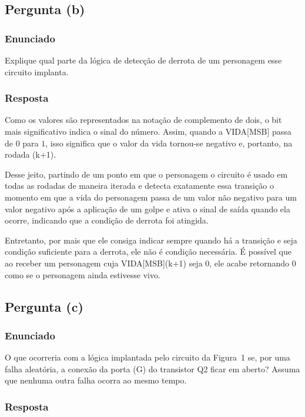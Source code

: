\documentclass[12pt]{article}
\begin{document}
\subsection{Pergunta (b)}

\subsubsection*{Enunciado}

Explique qual parte da lógica de detecção de derrota de um personagem
esse circuito implanta.

\subsubsection*{Resposta}

Como os valores são representados na notação de complemento de dois, o bit mais significativo indica o sinal do número. Assim, quando a VIDA[MSB] passa de $0$ para $1$, isso significa que o valor da vida tornou-se negativo e, portanto, na rodada (k+1).

Desse jeito, partindo de um ponto em que o personagem o circuito é usado em todas as rodadas de maneira iterada e detecta exatamente essa transição o momento em que a vida do personagem
passa de um valor não negativo para um valor negativo após a aplicação
de um golpe e ativa o sinal
de saída quando ela ocorre, indicando que a condição de derrota foi
atingida.

Entretanto, por mais que ele consiga indicar sempre quando há a transição e seja condição suficiente para a derrota, ele não é condição necessária. É possível que ao receber um personagem cuja VIDA[MSB](k+1) seja 0, ele acabe retornando 0 como se o personagem ainda estivesse vivo.

\subsection{Pergunta (c)}

\subsubsection*{Enunciado}

O que ocorreria com a lógica implantada pelo circuito da Figura~1 se,
por uma falha aleatória, a conexão da porta (G) do transistor Q2 ficar
em aberto? Assuma que nenhuma outra falha ocorra ao mesmo tempo.

\subsubsection*{Resposta}
\end{document}
